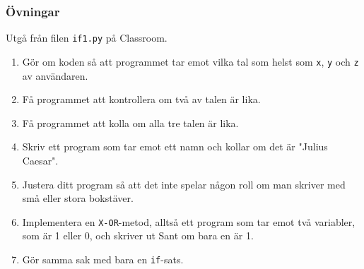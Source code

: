 \documentclass[aspectratio=169]{beamer}
\begin{document}
\begin{frame}
\frametitle{Övningar}

Utgå från filen \texttt{if1.py} på Classroom.

\begin{enumerate}
	\item Gör om koden så att programmet tar emot vilka tal som helst som \lstinline{x}, \lstinline{y} och \lstinline{z} av användaren.
	\item Få programmet att kontrollera om två av talen är lika.
	\item Få programmet att kolla om alla tre talen är lika.
	\item Skriv ett program som tar emot ett namn och kollar om det är "Julius Caesar".
	\item Justera ditt program så att det inte spelar någon roll om man skriver med små eller stora bokstäver.
	\item Implementera en \texttt{X-OR}-metod, alltså ett program som tar emot två variabler, som är 1 eller 0, och skriver ut Sant om bara en är 1.
	\item Gör samma sak med bara en \lstinline{if}-sats.
\end{enumerate}

\end{frame}
\end{document}
